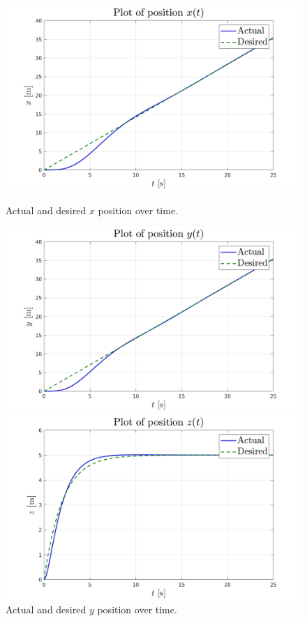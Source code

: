 \begin{figure}[h!]
    \centering
    \begin{minipage}[b]{0.49\textwidth}
        \centering
        \includegraphics[width=\textwidth]{images/pid_x.png}
        \caption[Tracking in X-axis]{Actual and desired $x$ position over time.}
        \label{fig:pid_x}
    \end{minipage}
    \begin{minipage}[b]{0.49\textwidth}
        \centering
        \includegraphics[width=\textwidth]{images/pid_y.png}
        \caption[Tracking in Y-axis]{Actual and desired $y$ position over time.}
        \label{fig:pid_y}
    \end{minipage}
    \begin{minipage}[b]{0.49\textwidth}
        \centering
        \includegraphics[width=\textwidth]{images/pid_z.png}

\end{minipage}
\end{figure}
